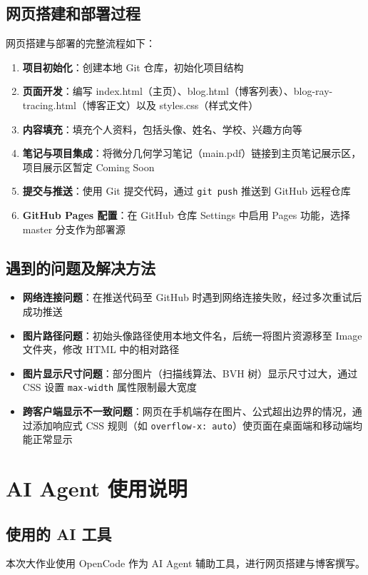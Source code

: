 \documentclass[UTF8]{article}
\begin{document}
\subsection{网页搭建和部署过程}

网页搭建与部署的完整流程如下：

\begin{enumerate}
    \item \textbf{项目初始化}：创建本地 Git 仓库，初始化项目结构
    \item \textbf{页面开发}：编写 index.html（主页）、blog.html（博客列表）、blog-ray-tracing.html（博客正文）以及 styles.css（样式文件）
    \item \textbf{内容填充}：填充个人资料，包括头像、姓名、学校、兴趣方向等
    \item \textbf{笔记与项目集成}：将微分几何学习笔记（main.pdf）链接到主页笔记展示区，项目展示区暂定 Coming Soon
    \item \textbf{提交与推送}：使用 Git 提交代码，通过 \texttt{git push} 推送到 GitHub 远程仓库
    \item \textbf{GitHub Pages 配置}：在 GitHub 仓库 Settings 中启用 Pages 功能，选择 master 分支作为部署源
\end{enumerate}

\subsection{遇到的问题及解决方法}

\begin{itemize}
    \item \textbf{网络连接问题}：在推送代码至 GitHub 时遇到网络连接失败，经过多次重试后成功推送
    \item \textbf{图片路径问题}：初始头像路径使用本地文件名，后统一将图片资源移至 Image 文件夹，修改 HTML 中的相对路径
    \item \textbf{图片显示尺寸问题}：部分图片（扫描线算法、BVH 树）显示尺寸过大，通过 CSS 设置 \texttt{max-width} 属性限制最大宽度
    \item \textbf{跨客户端显示不一致问题}：网页在手机端存在图片、公式超出边界的情况，通过添加响应式 CSS 规则（如 \texttt{overflow-x: auto}）使页面在桌面端和移动端均能正常显示
\end{itemize}

\section{AI Agent 使用说明}

\subsection{使用的 AI 工具}
本次大作业使用 OpenCode 作为 AI Agent 辅助工具，进行网页搭建与博客撰写。
\end{document}

